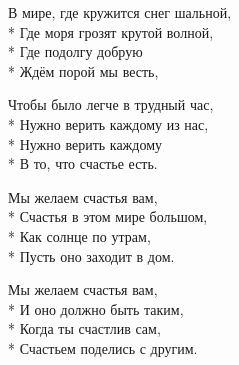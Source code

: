 \medskip

\begin{minipage}{\linewidth}
В мире, где кружится снег шальной,\\*
Где моря грозят крутой волной,\\*
Где подолгу добрую\\*
Ждём порой мы весть,\\
\end{minipage}\par\medskip\nobreak

\medskip

\begin{minipage}{\linewidth}
Чтобы было легче в трудный час,\\*
Нужно верить каждому из нас,\\*
Нужно верить каждому\\*
В то, что счастье есть.\\
\end{minipage}\par\medskip\nobreak

\medskip

\begin{minipage}{\linewidth}
\hspace*{1.5em}Мы желаем счастья вам,\\*
\hspace*{1.5em}Счастья в этом мире большом,\\*
\hspace*{1.5em}Как солнце по утрам,\\*
\hspace*{1.5em}Пусть оно заходит в дом.\\
\end{minipage}\par\medskip\nobreak

\medskip

\begin{minipage}{\linewidth}
\hspace*{1.5em}Мы желаем счастья вам,\\*
\hspace*{1.5em}И оно должно быть таким,\\*
\hspace*{1.5em}Когда ты счастлив сам,\\*
\hspace*{1.5em}Счастьем поделись с другим.\\
\end{minipage}\par\medskip\nobreak

